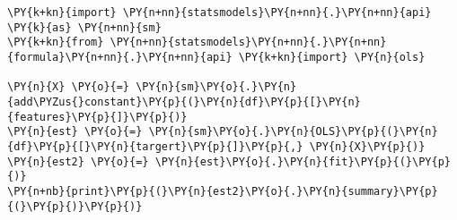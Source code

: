     \begin{tcolorbox}[breakable, size=fbox, boxrule=1pt, pad at break*=1mm,colback=cellbackground, colframe=cellborder]
\begin{Verbatim}[commandchars=\\\{\}]
\PY{k+kn}{import} \PY{n+nn}{statsmodels}\PY{n+nn}{.}\PY{n+nn}{api} \PY{k}{as} \PY{n+nn}{sm}
\PY{k+kn}{from} \PY{n+nn}{statsmodels}\PY{n+nn}{.}\PY{n+nn}{formula}\PY{n+nn}{.}\PY{n+nn}{api} \PY{k+kn}{import} \PY{n}{ols}

\PY{n}{X} \PY{o}{=} \PY{n}{sm}\PY{o}{.}\PY{n}{add\PYZus{}constant}\PY{p}{(}\PY{n}{df}\PY{p}{[}\PY{n}{features}\PY{p}{]}\PY{p}{)}
\PY{n}{est} \PY{o}{=} \PY{n}{sm}\PY{o}{.}\PY{n}{OLS}\PY{p}{(}\PY{n}{df}\PY{p}{[}\PY{n}{targert}\PY{p}{]}\PY{p}{,} \PY{n}{X}\PY{p}{)}
\PY{n}{est2} \PY{o}{=} \PY{n}{est}\PY{o}{.}\PY{n}{fit}\PY{p}{(}\PY{p}{)}
\PY{n+nb}{print}\PY{p}{(}\PY{n}{est2}\PY{o}{.}\PY{n}{summary}\PY{p}{(}\PY{p}{)}\PY{p}{)}
\end{Verbatim}
\end{tcolorbox}

